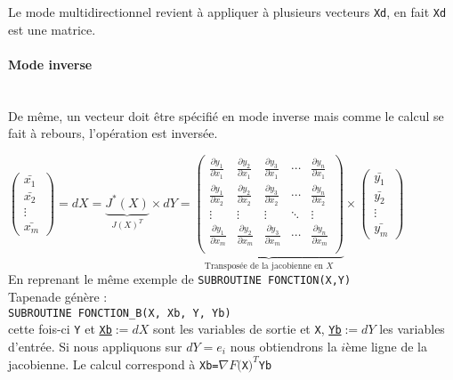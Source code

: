 Le mode multidirectionnel revient \`a appliquer \`a plusieurs vecteurs {\tt Xd}, en fait {\tt Xd} est une matrice. %


\paragraph{Mode inverse} \hfill \\
De même, un vecteur doit être sp\'ecifi\'e en mode inverse mais comme le calcul se fait \`a rebours, l'op\'eration 
est invers\'ee.




$\left( 
\begin{array}{c} 
\bar{x_1} \\
\bar{x_2} \\
\vdots \\
\bar{x_m}

\end{array}
\right)
=dX = \underbrace{J^*(X)}_{J(X)^T} \times dY = 
\underbrace{
\left(
\begin{array}{ccccc} 
\frac{\partial y_1}{\partial x_1} & \frac{\partial y_2}{\partial x_1} &
 \frac{\partial y_3}{\partial x_1} & \cdots & \frac{\partial y_n}{\partial x_1} \\
\frac{\partial y_1}{\partial x_2} & \frac{\partial y_2}{\partial x_2} &
 \frac{\partial y_3}{\partial x_2} & \cdots & \frac{\partial y_n}{\partial x_2} \\
\vdots & \vdots & \vdots & \ddots & \vdots \\
\frac{\partial y_1}{\partial x_m} & \frac{\partial y_2}{\partial x_m} &
 \frac{\partial y_3}{\partial x_m} & \cdots & \frac{\partial y_n}{\partial x_m} \\
\end{array}
\right)}_{\text{Transpos\'ee de la jacobienne en }X}
 \times
\left( 
\begin{array}{c} 
\bar{y_1} \\
\bar{y_2} \\
\vdots \\
\bar{y_m}

\end{array}
\right)
 $ \\ 
En reprenant le même exemple de 
\verb!SUBROUTINE FONCTION(X,Y)!\\
Tapenade g\'en\`ere :\\
\verb!SUBROUTINE FONCTION_B(X, Xb, Y, Yb)!\\
cette fois-ci {\tt Y} et {\tt \underline{Xb}}$:=dX$ sont les variables de sortie et {\tt X}, {\tt\underline{Yb}}$:=dY$ les variables d'entr\'ee. 
Si nous appliquons sur $dY=e_i$ nous obtiendrons la $i$\`eme ligne de la jacobienne.
Le calcul correspond \`a {\tt Xb=}$\nabla F(${\tt X}$)^T${\tt Yb}





